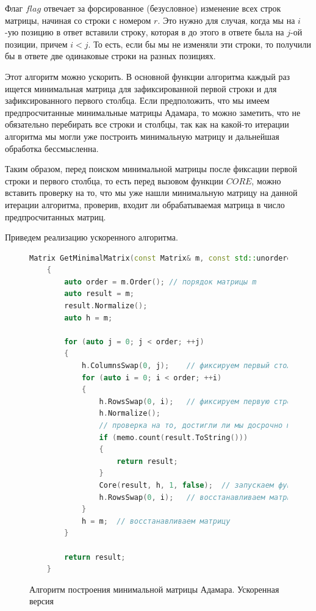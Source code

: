 Флаг $flag$ отвечает за форсированное (безусловное) изменение всех строк матрицы, начиная со строки с номером $r$. Это нужно для случая, когда мы на $i$-ую позицию в ответ вставили строку, которая в до этого в ответе была на $j$-ой позиции, причем $i < j$. То есть, если бы мы не изменяли эти строки, то получили бы в ответе две одинаковые строки на разных позициях.

Этот алгоритм можно ускорить. В основной функции алгоритма каждый раз ищется минимальная матрица для зафиксированной первой строки и для зафиксированного первого столбца. Если предположить, что мы имеем предпросчитанные минимальные матрицы Адамара, то можно заметить, что не обязательно перебирать все строки и столбцы, так как на какой-то итерации алгоритма мы могли уже построить минимальную матрицу и дальнейшая обработка бессмысленна.

Таким образом, перед поиском минимальной матрицы после фиксации первой строки и первого столбца, то есть перед вызовом функции $CORE$, можно вставить проверку на то, что мы уже нашли минимальную матрицу на данной итерации алгоритма, проверив, входит ли обрабатываемая матрица в число предпросчитанных матриц.

Приведем реализацию ускоренного алгоритма.

\begin{figure}[H]
    \centering
    \begin{minipage}{\linewidth}
    \begin{lstlisting}[language=c++, tabsize=4, showspaces=false, basicstyle=\fontsize{9.5}{7.0}\selectfont, numbers=none]
    Matrix GetMinimalMatrix(const Matrix& m, const std::unordered_set<std::string>& memo)
    {
        auto order = m.Order(); // порядок матрицы m
        auto result = m;
        result.Normalize();
        auto h = m;
    
        for (auto j = 0; j < order; ++j)
        {
            h.ColumnsSwap(0, j);    // фиксируем первый столбец
            for (auto i = 0; i < order; ++i)
            {
                h.RowsSwap(0, i);   // фиксируем первую строку
                h.Normalize();
                // проверка на то, достигли ли мы досрочно минимальной матрицы
                if (memo.count(result.ToString()))
                {
                    return result;
                }
                Core(result, h, 1, false);  // запускаем функцию по поиску минимальной матрицы
                h.RowsSwap(0, i);   // восстанавливаем матрицу
            }
            h = m;  // восстанавливаем матрицу
        }
    
        return result;
    }
    \end{lstlisting}
    \end{minipage}
    \caption{Алгоритм построения минимальной матрицы Адамара. Ускоренная версия}
    \label{alg:mm_finder_main_acc}
\end{figure}

